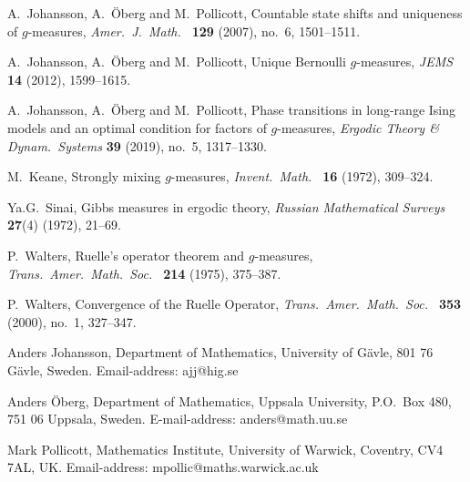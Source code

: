 \documentclass[11pt, a4paper]{amsart}
\theoremstyle{definition}
\theoremstyle{remark}
\begin{document}
\begin{thebibliography}{999}
   A.\ Johansson, A.\ \"Oberg and M.\ Pollicott, Countable state
  shifts and uniqueness of $g$-measures, {\em Amer.\ J.\ Math.\ } {\bf 129}
  (2007), no.\ 6, 1501--1511.

   A.\ Johansson, A.\ \"Oberg and M.\ Pollicott, Unique
  Bernoulli $g$-measures, {\em JEMS} {\bf 14} (2012), 1599--1615.

   A.\ Johansson, A.\ \"Oberg and M.\ Pollicott, Phase
  transitions in long-range Ising models and an optimal condition for factors of
  $g$-measures, {\em Ergodic Theory \& Dynam.\ Systems} {\bf 39} (2019), no.\ 5,
  1317--1330.

  
   M.\ Keane, Strongly mixing $g$-measures, {\em Invent.\ Math.\
  } {\bf 16} (1972), 309--324.

   Ya.G.\ Sinai, Gibbs measures in ergodic theory, {\em Russian
    Mathematical Surveys} {\bf 27}(4) (1972), 21--69.

   P.\ Walters, Ruelle's operator theorem and $g$-measures,
  {\em Trans.\ Amer.\ Math.\ Soc.\ } {\bf 214} (1975), 375--387.

   P.\ Walters, Convergence of the Ruelle Operator, {\em
    Trans.\ Amer.\ Math.\ Soc.\ } {\bf 353} (2000), no.\ 1, 327--347.
\end{thebibliography}


\noindent
Anders Johansson, Department of Mathematics, University of G\"avle, 801 76
G\"avle, Sweden. Email-address: ajj@hig.se\newline

\noindent
Anders \"Oberg, Department of Mathematics, Uppsala University, P.O.\ Box 480,
751 06 Uppsala, Sweden. E-mail-address: anders@math.uu.se\newline

\noindent
Mark Pollicott, Mathematics Institute, University of Warwick, Coventry, CV4 7AL,
UK. Email-address: mpollic@maths.warwick.ac.uk\newline
\end{document}
